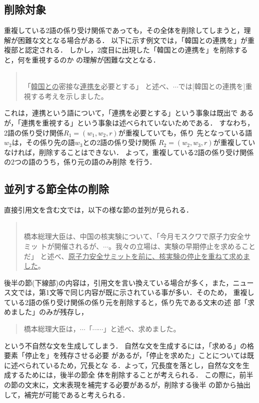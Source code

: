 \subsection{削除対象} \label{sakujo_taishou}
重複している2語の係り受け関係であっても，その全体を削除してしまうと，理
解が困難な文となる場合がある．
以下に示す例文では，「韓国との連携を」が重複部と認定される．
しかし，2度目に出現した「韓国との連携を」を削除すると，何を重視するのか
の理解が困難な文となる．
\vspace{5mm}
\begin{quote} \label{rei:rei5}
\hspace*{-1em}{\bf 例5：}\\
\hspace*{1em}「\underline{韓国との}密接な\underline{連携を}必要とする」
 と述べ、$\cdots$では[韓国との連携を]重視する考えを示しました。
\end{quote}
\vspace{5mm}
これは，連携という語について，「連携を必要とする」という事象は既出で
あるが，「連携を重視する」という事象は述べられていないためである．
すなわち，2語の係り受け関係$R_{1}=(w_{1},w_{2},r)$が重複していても，係り
先となっている語$w_{2}$は，その係り先の語$w_{3}$との2語の係り受け関係
$R_{2}=(w_{2},w_{3},r)$が重複していなければ，削除することはできない．
よって，重複している2語の係り受け関係の2つの語のうち，係り元の語のみ削除
を行う．


\subsection{並列する節全体の削除} \label{sakujo_heiretsu}
直接引用文を含む文では，以下の様な節の並列が見られる．
\vspace{5mm}\begin{quote} \label{rei:rei6}
\hspace*{-1em}{\bf 例6：}\\
 橋本総理大臣は、中国の核実験について、「今月モスクワで原子力安全サミッ
 トが開催されるが、$\cdots$。我々の立場は、実験の早期停止を求めることだ」
 と述べ、\underline{原子力安全サミットを前に、核実験の停止を重ねて求めま
 した}。
\end{quote}\vspace{5mm}
後半の節(下線部)の内容は，引用文を言い換えている場合が多く，また，ニュー
ス文では，第1文等で同じ内容が既に示されている事が多い．そのため，
重複している2語の係り受け関係の係り元を削除すると，係り先である文末の述
部「求めました」のみが残存し，
\begin{quote}
 橋本総理大臣は，$\cdots$「$\cdots\cdots$」と述べ、求めました。
\end{quote}
という不自然な文を生成してしまう．
自然な文を生成するには，「求める」の格要素「停止を」を残存させる必要
があるが，「停止を求めた」ことについては既に述べられているため，冗長とな
る．よって，冗長度を落とし，自然な文を生成するためには，後半の節全
体を削除することが考えられる．
この際に，前半の節の文末に，文末表現を補完する必要があるが，削除する後半
の節から抽出して，補完が可能であると考えられる．

